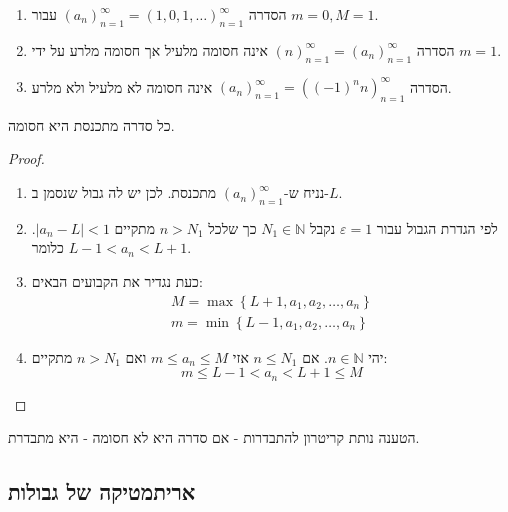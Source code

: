 \documentclass{tstextbook}
\begin{document}
\begin{example}
  \begin{enumerate}
    \item הסדרה \((a_n)_{n=1}^\infty=\left( 1,0,1,\dots \right)_{n=1}^\infty\) עבור \(m=0,M=1\). 


    \item הסדרה \((n)_{n=1}^\infty=(a_n)_{n=1}^\infty\) אינה חסומה מלעיל אך חסומה מלרע על ידי \(m=1\). 


    \item הסדרה \((a_n)_{n=1}^\infty=((-1)^{n}n)_{n=1}^\infty\) אינה חסומה לא מלעיל ולא מלרע. 


  \end{enumerate}
\end{example}
\begin{proposition}
כל סדרה מתכנסת היא חסומה.

\end{proposition}
\begin{proof}
  \begin{enumerate}
    \item נניח ש-\((a_n)_{n=1}^\infty\) מתכנסת. לכן יש לה גבול שנסמן ב-\(L\). 


    \item לפי הגדרת הגבול עבור \(\varepsilon=1\) נקבל \(N_{1}\in \mathbb{N}\) כך שלכל \(n>N_{1}\) מתקיים \(|a_{n}-L|<1\). כלומר \(L-1<a_{n}<L+1\). 


    \item כעת נגדיר את הקבועים הבאים: 
$$\begin{gather}M=\max \left\{  L+1,a_{1}, a_{2},\dots,a_{n}  \right\} \\m=\min \left\{  L-1 ,a_{1},a_{2},\dots,a_{n} \right\}
\end{gather}$$


    \item יהי \(n \in \mathbb{N}\). אם \(n\leq N_{1}\) אזי \(m\leq a_{n}\leq M\) ואם \(n>N_{1}\) מתקיים: 
$$m\leq L-1<a_{n}<L+1\leq M$$


  \end{enumerate}
\end{proof}
\begin{remark}
הטענה נותת קריטרון להתבדרות - אם סדרה היא לא חסומה - היא מתבדרת.

\end{remark}
\subsection{אריתמטיקה של גבולות}
\end{document}
